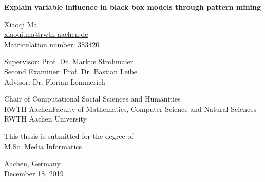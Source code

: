 \begin{titlepage}
    \begin{center}
        \vspace*{1cm}
        
        \huge
        \textbf{Explain variable influence in black box models through pattern mining}
        
        \vspace{2cm}
        
        \large
        Xiaoqi Ma \\
        \href{mailto:xiaoqi.ma@rwth-aachen.de}{xiaoqi.ma@rwth-aachen.de} \\
        Matriculation number: 383420

        \vspace{1cm}

        Supervisor: Prof. Dr. Markus Strohmaier \\
        Second Examiner: Prof. Dr. Bastian Leibe\\
        Advisor: Dr. Florian Lemmerich \\

        \vspace{1.5cm}

        Chair of Computational Social Sciences and Humanities \\
        RWTH AachenFaculty of Mathematics, Computer Science and Natural Sciences \\
        RWTH Aachen University 
        
        \vfill
        
        This thesis is submitted for the degree of \\
        M.Sc. Media Informatics
        
        \vspace{3cm}
        
        Aachen, Germany \\
        December 18, 2019
        
        
    \end{center}
\end{titlepage}